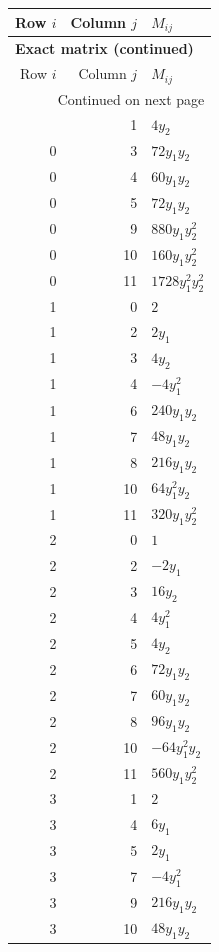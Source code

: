 \documentclass[10pt,a4paper]{article}
\begin{document}
{\small\setlength{\tabcolsep}{7pt}\begin{longtable}{rrp{125mm}}
\toprule Row $i$ & Column $j$ & $M_{ij}$\\\midrule\endfirsthead
\multicolumn{3}{l}{\textbf{Exact matrix (continued)}}\\
\toprule Row $i$ & Column $j$ & $M_{ij}$\\\midrule\endhead
\midrule\multicolumn{3}{r}{Continued on next page}\\\endfoot\bottomrule\endlastfoot
0 & 1 & $4 y_{2}$\\
0 & 3 & $72 y_{1} y_{2}$\\
0 & 4 & $60 y_{1} y_{2}$\\
0 & 5 & $72 y_{1} y_{2}$\\
0 & 9 & $880 y_{1} y_{2}^{2}$\\
0 & 10 & $160 y_{1} y_{2}^{2}$\\
0 & 11 & $1728 y_{1}^{2} y_{2}^{2}$\\
1 & 0 & $2$\\
1 & 2 & $2 y_{1}$\\
1 & 3 & $4 y_{2}$\\
1 & 4 & $- 4 y_{1}^{2}$\\
1 & 6 & $240 y_{1} y_{2}$\\
1 & 7 & $48 y_{1} y_{2}$\\
1 & 8 & $216 y_{1} y_{2}$\\
1 & 10 & $64 y_{1}^{2} y_{2}$\\
1 & 11 & $320 y_{1} y_{2}^{2}$\\
2 & 0 & $1$\\
2 & 2 & $- 2 y_{1}$\\
2 & 3 & $16 y_{2}$\\
2 & 4 & $4 y_{1}^{2}$\\
2 & 5 & $4 y_{2}$\\
2 & 6 & $72 y_{1} y_{2}$\\
2 & 7 & $60 y_{1} y_{2}$\\
2 & 8 & $96 y_{1} y_{2}$\\
2 & 10 & $- 64 y_{1}^{2} y_{2}$\\
2 & 11 & $560 y_{1} y_{2}^{2}$\\
3 & 1 & $2$\\
3 & 4 & $6 y_{1}$\\
3 & 5 & $2 y_{1}$\\
3 & 7 & $- 4 y_{1}^{2}$\\
3 & 9 & $216 y_{1} y_{2}$\\
3 & 10 & $48 y_{1} y_{2}$\\

\end{longtable}}
\end{document}
